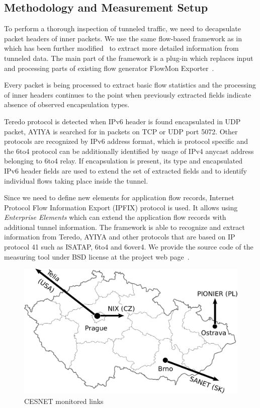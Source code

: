 \subsection{Methodology and Measurement Setup} \label{subsec:ipv6-tunnels-met-mon-setup}

To perform a thorough inspection of tunneled traffic, we need to decapsulate packet headers of inner packets. We use the same flow-based framework as in~\cite{Elich-2011-Monitoring} which has been further modified~\cite{Elich-2013-FlowMon} to extract more detailed information from tunneled data. The main part of the framework is a plug-in which replaces input and processing parts of existing flow generator FlowMon Exporter~\cite{FlowmonNetworks--Flowmon}. 

Every packet is being processed to extract basic flow statistics and the processing of inner headers continues to the point when previously extracted fields indicate absence of observed encapsulation types.

Teredo protocol is detected when IPv6 header is found encapsulated in UDP packet, AYIYA is searched for in packets on TCP or UDP port 5072. Other protocols are recognized by IPv6 address format, which is protocol specific and the 6to4 protocol can be additionally identified by usage of IPv4 anycast address belonging to 6to4 relay. If encapsulation is present, its type and encapsulated IPv6 header fields are used to extend the set of extracted fields and to identify individual flows taking place inside the tunnel. 

Since we need to define new elements for application flow records, Internet Protocol Flow Information Export (IPFIX) protocol is used. It allows using \emph{Enterprise Elements} which can extend the application flow records with additional tunnel information. 
The framework is able to recognize and extract information from Teredo, AYIYA and other protocols that are based on IP protocol 41 such as ISATAP, 6to4 and 6over4. 
We provide the source code of the measuring tool under BSD license at the project web page~\cite{Elich-2013-FlowMon}.

\begin{figure}[!tb]
\centering
\includegraphics[width=0.9\linewidth]{figures/paper-tunnels/cesnet-map}
\caption{CESNET monitored links}
\label{fig:ipv6-tunnels-topology}
\end{figure}

